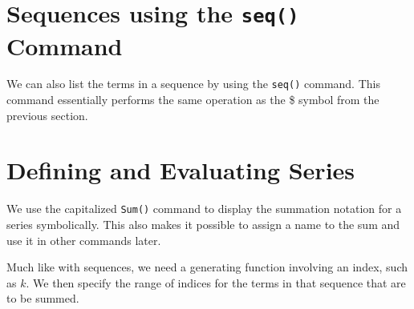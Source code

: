 \section{Sequences using the \texttt{seq()} Command}

We can also list the terms in a sequence by using the \texttt{seq()} command. This command essentially performs the same operation as the \$ symbol from the previous section.


\begin{maplegroup}
\begin{mapleinput}
\end{mapleinput}
\mapleresult
\begin{maplelatex}
\end{maplelatex}
\end{maplegroup}

\section{Defining and Evaluating Series}

We use the capitalized \texttt{Sum()} command to display the summation notation for a series symbolically. This also makes it possible to assign a name to the sum and use it in other commands later.

Much like with sequences, we need a generating function involving an index, such as $k$. We then specify the range of indices for the terms in that sequence that are to be summed.

\begin{maplegroup}
\begin{mapleinput}
\end{mapleinput}
\mapleresult
\begin{maplelatex}
\end{maplelatex}
\end{maplegroup}


